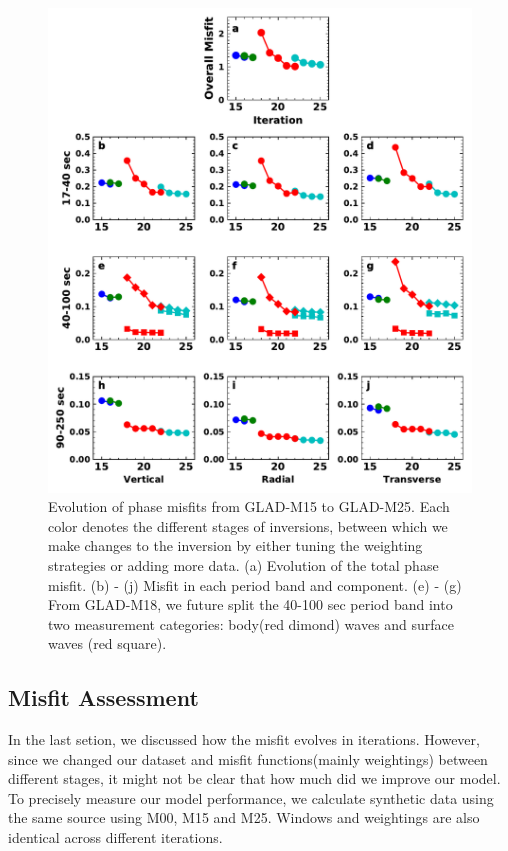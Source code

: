 \documentclass[extra,mreferee]{gji}
\begin{document}
\begin{figure}
  \centering
  \includegraphics[width=\textwidth]{figures/misfit.pdf}
  \caption{Evolution of phase misfits from GLAD-M15 to GLAD-M25.
  Each color denotes the different stages of inversions, between
  which we make changes to the inversion by either tuning the
  weighting strategies or adding more data.
  (a) Evolution of the total phase misfit. (b) - (j) Misfit in
  each period band and component. (e) - (g) From GLAD-M18,
  we future split the 40-100 sec period band into two
  measurement categories: body(red dimond) waves and surface waves
  (red square).}
  \label{fig:misfit}
\end{figure}

\subsection{Misfit Assessment}

In the last setion, we discussed how the misfit evolves in iterations. However, since
we changed our dataset and misfit functions(mainly weightings) between different stages,
it might not be clear that how much did we improve our model. To precisely measure
our model performance, we calculate synthetic data using the same source using M00, M15
and M25. Windows and weightings are also identical across different iterations.
\end{document}

